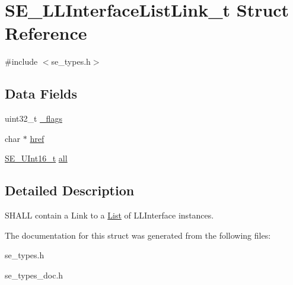 \hypertarget{structSE__LLInterfaceListLink__t}{}\section{S\+E\+\_\+\+L\+L\+Interface\+List\+Link\+\_\+t Struct Reference}
\label{structSE__LLInterfaceListLink__t}


{\ttfamily \#include $<$se\+\_\+types.\+h$>$}

\subsection*{Data Fields}
\begin{DoxyCompactItemize}
\item 
uint32\+\_\+t \hyperlink{group__LLInterfaceListLink_ga6fe2edb567956b79e403f7d527f393c9}{\+\_\+flags}
\item 
char $\ast$ \hyperlink{group__LLInterfaceListLink_gae5704d601086f05c2eec2e9fa79575e1}{href}
\item 
\hyperlink{group__UInt16_gac68d541f189538bfd30cfaa712d20d29}{S\+E\+\_\+\+U\+Int16\+\_\+t} \hyperlink{group__LLInterfaceListLink_ga56592daceaa11b288eabb30bc1c2a6f8}{all}
\end{DoxyCompactItemize}


\subsection{Detailed Description}
S\+H\+A\+LL contain a Link to a \hyperlink{structList}{List} of L\+L\+Interface instances. 

The documentation for this struct was generated from the following files\+:\begin{DoxyCompactItemize}
\item 
se\+\_\+types.\+h\item 
se\+\_\+types\+\_\+doc.\+h\end{DoxyCompactItemize}
